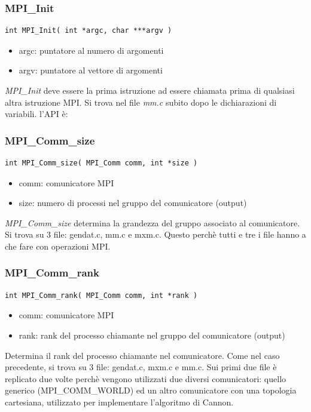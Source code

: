 \subsubsection{MPI\_Init}
\begin{lstlisting}
int MPI_Init( int *argc, char ***argv )
\end{lstlisting}
\begin{itemize}
  \item argc: puntatore al numero di argomenti
  \item argv: puntatore al vettore di argomenti
\end{itemize}

\textit{MPI\_Init} deve essere la prima istruzione ad essere chiamata prima di qualsiasi altra istruzione MPI. Si trova nel file \textit{mm.c} subito dopo le dichiarazioni di variabili. l'API \`{e}:

\subsubsection{MPI\_Comm\_size}
\begin{lstlisting}
int MPI_Comm_size( MPI_Comm comm, int *size )
\end{lstlisting}
\begin{itemize}
  \item comm: comunicatore MPI
  \item size: numero di processi nel gruppo del comunicatore (output)
\end{itemize}

\textit{MPI\_Comm\_size} determina la grandezza del gruppo associato al comunicatore. Si trova su 3 file: gendat.c, mm.c e mxm.c. Questo perch\`{e} tutti e tre i file hanno a che fare con operazioni MPI.

\subsubsection{MPI\_Comm\_rank}
\begin{lstlisting}
int MPI_Comm_rank( MPI_Comm comm, int *rank )
\end{lstlisting}
\begin{itemize}
  \item comm: comunicatore MPI
  \item rank: rank del processo chiamante nel gruppo del comunicatore (output)
\end{itemize}

Determina il rank del processo chiamante nel comunicatore. Come nel caso precedente, si trova su 3 file: gendat.c, mxm.c e mm.c. Sui primi due file \`{e} replicato due volte perch\`{e} vengono utilizzati due diversi comunicatori: quello generico (MPI\_COMM\_WORLD) ed un altro comunicatore con una topologia cartesiana, utilizzato per implementare l'algoritmo di Cannon.

